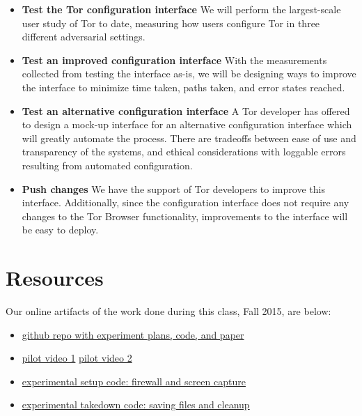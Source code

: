 \documentclass{template}
\begin{document}
\begin{itemize} \itemsep1pt \parskip0pt 
\item {\bfseries Test the Tor configuration interface} We will perform the largest-scale user study 
of Tor to date, measuring how users configure Tor in three different adversarial settings. 
\item {\bfseries Test an improved configuration interface} With the measurements collected
from testing the interface as-is, we will be designing ways to improve the interface to minimize
time taken, paths taken, and error states reached.
\item {\bfseries Test an alternative configuration interface} A Tor developer has offered
to design a mock-up interface for an alternative configuration interface which will
greatly automate the process. There are tradeoffs between ease of use and transparency
of the systems, and ethical considerations with loggable errors resulting from automated configuration. 
\item {\bfseries Push changes} We have the support of Tor developers
to improve this interface. Additionally, since the configuration interface does not require 
any changes to the Tor Browser functionality, improvements to the interface will
be easy to deploy. 
\end{itemize}

\section{Resources}
\noindent Our online artifacts of the work done during this class, Fall 2015,
are below: 
\begin{itemize} \itemsep1pt \parskip0pt 
\item \href{https://github.com/lindanlee/circumvention-ux-tor}{github repo with experiment plans, code, and paper}
\item \href {https://github.com/lindanlee/circumvention-ux-tor/blob/master/pilot/1-strict.mp4}{pilot video 1}
	\href{https://github.com/lindanlee/circumvention-ux-tor/blob/master/pilot/2-lax.mp4}{pilot video 2}
\item \href{https://github.com/lindanlee/circumvention-ux-tor/blob/master/setup/setup-environment}{experimental setup code: firewall and screen capture} 
\item \href{https://github.com/lindanlee/circumvention-ux-tor/blob/master/setup/takedown-environment}{experimental takedown code: saving files and cleanup} 
\end{itemize}
\end{document}
